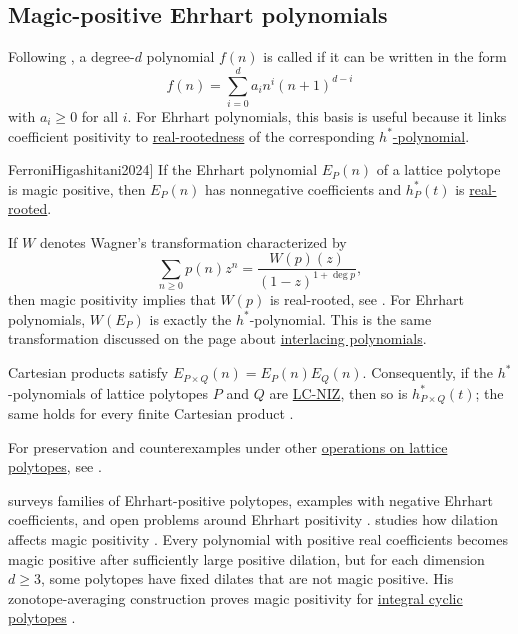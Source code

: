 \subsection[magicPositiveEhrhartDefinition]{Magic-positive Ehrhart polynomials}

Following \cite{FerroniHigashitani2024}, a degree-$d$ polynomial $f(n)$ is
called \label{magicPositivePolynomial}
if it can be written in the form
\[
 f(n) = \sum_{i=0}^d a_i n^i (n+1)^{d-i}
\]
with $a_i \geq 0$ for all $i$.
For Ehrhart polynomials, this basis is useful because it links coefficient
positivity to \hyperref[realRootedPolynomial]{real-rootedness} of the
corresponding \hyperref[hStarPolynomial]{$h^*$-polynomial}.

\begin{theorem}[Brändén; see \cite[Thm.~4.19]{FerroniHigashitani2024}]
If the Ehrhart polynomial $E_P(n)$ of a lattice polytope is magic positive,
then $E_P(n)$ has nonnegative coefficients and $h^*_P(t)$ is
\hyperref[realRootedPolynomial]{real-rooted}.
\end{theorem}

If $W$ denotes Wagner's transformation characterized by
\[
 \sum_{n \geq 0} p(n) z^n = \frac{W(p)(z)}{(1-z)^{1+\deg p}},
\]
then magic positivity implies that $W(p)$ is real-rooted, see
\cite[Rem.~4.21]{FerroniHigashitani2024}.
For Ehrhart polynomials, $W(E_P)$ is exactly the $h^*$-polynomial.
This is the same transformation discussed on the page about
\hyperref[interlacingPolynomials]{interlacing polynomials}.

Cartesian products satisfy $E_{P\times Q}(n)=E_P(n)E_Q(n)$.  Consequently,
if the $h^*$-polynomials of lattice polytopes $P$ and $Q$ are
\hyperref[lcNizPolynomial]{LC-NIZ}, then so is $h^*_{P\times Q}(t)$; the same
holds for every finite Cartesian product
\cite[Cor.~5.1]{LiuMao2026Hadamard}.

For preservation and counterexamples under other
\hyperref[ehrhartOperations]{operations on lattice polytopes}, see
\cite{Liu2026EhrhartOperations}.

 surveys families of Ehrhart-positive polytopes, examples with
negative Ehrhart coefficients, and open problems around Ehrhart positivity
\cite{Liu2017}.
 studies how dilation affects magic positivity
\cite{Konoike2025x}.  Every polynomial with positive real coefficients becomes
magic positive after sufficiently large positive dilation, but for each
dimension $d\geq 3$, some polytopes have fixed dilates that are not magic
positive.
His zonotope-averaging construction proves magic positivity for
\hyperref[cyclicPolytopeMagicPositivity]{integral cyclic polytopes}
\cite[Thm.~1.1 and Cor.~1.2]{Konoike2026x}.

